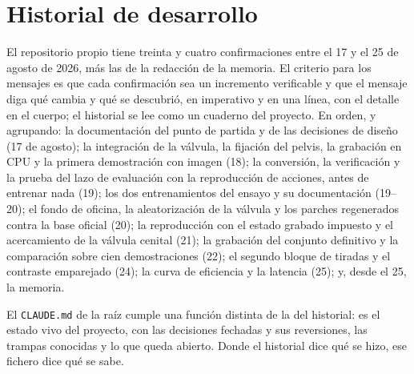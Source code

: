\section{Historial de desarrollo}

El repositorio propio tiene treinta y cuatro confirmaciones entre el 17 y el 25 de agosto de 2026,
más las de la redacción de la memoria. El criterio para los mensajes es que cada confirmación sea
un incremento verificable y que el mensaje diga qué cambia y qué se descubrió, en imperativo y en
una línea, con el detalle en el cuerpo; el historial se lee como un cuaderno del proyecto. En
orden, y agrupando: la documentación del punto de partida y de las decisiones de diseño (17 de
agosto); la integración de la válvula, la fijación del pelvis, la grabación en CPU y la primera
demostración con imagen (18); la conversión, la verificación y la prueba del lazo de evaluación
con la reproducción de acciones, antes de entrenar nada (19); los dos entrenamientos del ensayo y
su documentación (19--20); el fondo de oficina, la aleatorización de la válvula y los parches
regenerados contra la base oficial (20); la reproducción con el estado grabado impuesto y el
acercamiento de la válvula cenital (21); la grabación del conjunto definitivo y la comparación
sobre cien demostraciones (22); el segundo bloque de tiradas y el contraste emparejado (24); la
curva de eficiencia y la latencia (25); y, desde el 25, la memoria.

El \texttt{CLAUDE.md} de la raíz cumple una función distinta de la del historial: es el estado
vivo del proyecto, con las decisiones fechadas y sus reversiones, las trampas conocidas y lo que
queda abierto. Donde el historial dice qué se hizo, ese fichero dice qué se sabe.
